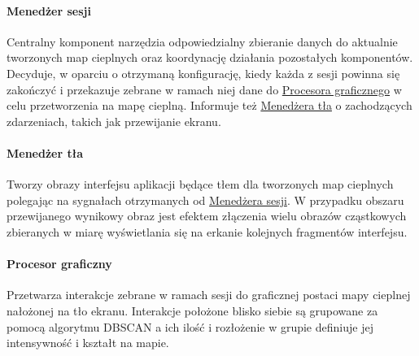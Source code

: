 \paragraph{Menedżer sesji} 
\label{par:rs_session_manager}
Centralny komponent narzędzia odpowiedzialny zbieranie danych do aktualnie tworzonych map cieplnych oraz koordynację działania pozostałych komponentów. Decyduje, w oparciu o otrzymaną konfigurację, kiedy każda z sesji powinna się zakończyć i przekazuje zebrane w ramach niej dane do  \hyperref[par:rs_graphical_processor]{Procesora graficznego} w celu przetworzenia na mapę cieplną. Informuje też \hyperref[par:rs_bg_manager]{Menedżera tła} o zachodzących zdarzeniach, takich jak przewijanie ekranu.

\paragraph{Menedżer tła} 
\label{par:rs_bg_manager}
Tworzy obrazy interfejsu aplikacji będące tłem dla tworzonych map cieplnych polegając na sygnałach otrzymanych od \hyperref[par:rs_session_manager]{Menedżera sesji}. W przypadku obszaru przewijanego wynikowy obraz jest efektem złączenia wielu  obrazów cząstkowych zbieranych w miarę wyświetlania się na erkanie kolejnych fragmentów interfejsu.

\paragraph{Procesor graficzny} 
\label{par:rs_graphical_processor}
Przetwarza interakcje zebrane w ramach sesji do graficznej postaci mapy cieplnej nałożonej na tło ekranu. Interakcje położone blisko siebie są grupowane za pomocą algorytmu DBSCAN a ich ilość i rozłożenie w grupie definiuje jej intensywność i kształt na mapie.
